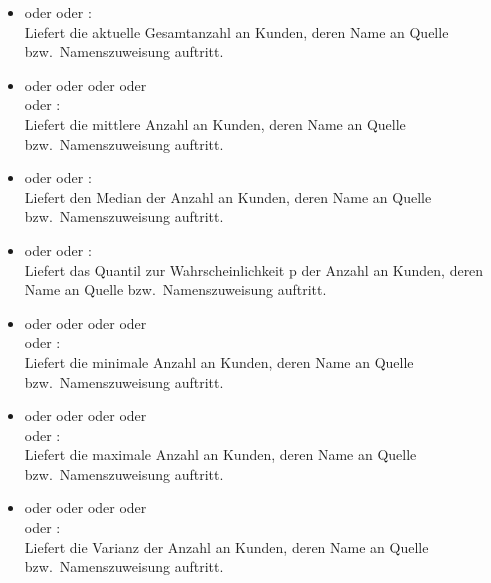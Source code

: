 \begin{itemize}

\item
{} oder  oder :\\
Liefert die aktuelle Gesamtanzahl an Kunden, deren Name an Quelle bzw.\ Namenszuweisung  auftritt.

\item
{} oder  oder  oder  oder\\
 oder :\\
Liefert die mittlere Anzahl an Kunden, deren Name an Quelle bzw.\ Namenszuweisung  auftritt.

\item
{} oder  oder :\\
Liefert den Median der Anzahl an Kunden, deren Name an Quelle bzw.\ Namenszuweisung  auftritt.

\item
{} oder  oder :\\
Liefert das Quantil zur Wahrscheinlichkeit p der Anzahl an Kunden, deren Name an Quelle bzw.\ Namenszuweisung  auftritt.

\item
{} oder  oder  oder  oder\\
 oder :\\
Liefert die minimale Anzahl an Kunden, deren Name an Quelle bzw.\ Namenszuweisung  auftritt.

\item
{} oder  oder  oder  oder\\
 oder :\\
Liefert die maximale Anzahl an Kunden, deren Name an Quelle bzw.\ Namenszuweisung  auftritt.

\item
{} oder  oder  oder  oder\\
 oder :\\
Liefert die Varianz der Anzahl an Kunden, deren Name an Quelle bzw.\ Namenszuweisung  auftritt.


\end{itemize}
